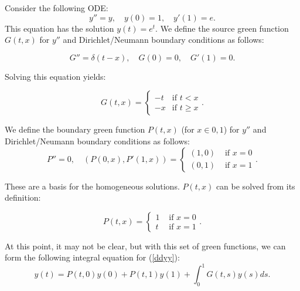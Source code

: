 \documentclass[a4paper,12pt]{article}
\begin{document}
\begin{example}[$y''=y$ mixed boundary conditions]
    Consider the following ODE:
    \begin{equation} \label{ddyy}
        y'' = y, \quad y(0) = 1, \quad y'(1) = e.
    \end{equation}
    This equation has the solution $y(t) = e^{t}$.
    We define the source green function $G(t,x)$ for $y''$
    and Dirichlet/Neumann boundary conditions as follows:

    \begin{equation}
        G'' = \delta(t-x), \quad G(0) = 0, \quad G'(1) = 0.
    \end{equation}

    Solving this equation yields:

    \begin{equation}
        G(t,x) =
        \begin{cases}
            -t & \text{if } t < x   \\
            -x & \text{if } t \ge x
        \end{cases}.
    \end{equation}

    We define the boundary green function $P(t,x)$
    (for $x \in {0,1}$) for $y''$ and Dirichlet/Neumann
    boundary conditions as follows:
    \begin{equation}
        P'' = 0, \quad \left(P(0,x),P'(1,x) \right) =
        \begin{cases}
            (1 , 0) & \text{ if } x=0 \\
            (0 , 1) & \text{ if } x=1
        \end{cases}.
    \end{equation}

    These are a basis for the homogeneous solutions.
    $P(t,x)$ can be solved from its definition:

    \begin{equation}
        P(t,x) =
        \begin{cases}
            1 & \text{ if } x=0 \\
            t & \text{ if } x=1
        \end{cases}.
    \end{equation}

    At this point, it may not be clear, but with this set of green functions,
    we can form the following integral equation for (\ref{ddyy}):
    \begin{equation} \label{int ddyy}
        y(t) = P(t,0)y(0) + P(t,1)y(1) + \int_{0}^{1}G(t,s) y(s) ds.
    \end{equation}


\end{example}
\end{document}
